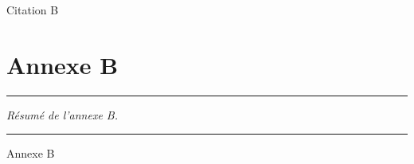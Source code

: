 

\begin{savequote}[45mm]
Citation B
\end{savequote}

\chapter{Annexe B}
\label{an:B}


\begin{center}
\rule{0.7\linewidth}{.5pt}
\begin{minipage}{0.7\linewidth}
\smallskip

\textit{
Résumé de l'annexe B.
}

\end{minipage}
\smallskip
\rule{0.7\linewidth}{.5pt}
\end{center}

{}
\adjustmtc[4]
\minitoc
\adjustmtc[-4]
\minilof
\minilot
\newpage


Annexe B
	

